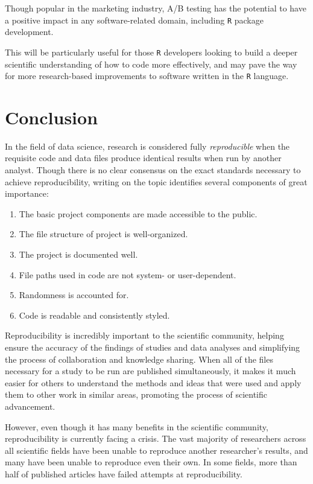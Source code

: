 \documentclass[12pt,twoside]{reedthesis}
\begin{document}
Though popular in the marketing industry, A/B testing has the potential to have a positive impact in any software-related domain, including \texttt{R} package development.

This will be particularly useful for those \texttt{R} developers looking to build a deeper scientific understanding of how to code more effectively, and may pave the way for more research-based improvements to software written in the \texttt{R} language.

\hypertarget{conclusion}{%
\chapter*{Conclusion}\label{conclusion}}

In the field of data science, research is considered fully \emph{reproducible} when the requisite code and data files produce identical results when run by another analyst. Though there is no clear consensus on the exact standards necessary to achieve reproducibility, writing on the topic identifies several components of great importance:
\begin{enumerate}
\def\labelenumi{\arabic{enumi}.}
\item
  The basic project components are made accessible to the public.
\item
  The file structure of project is well-organized.
\item
  The project is documented well.
\item
  File paths used in code are not system- or user-dependent.
\item
  Randomness is accounted for.
\item
  Code is readable and consistently styled.
\end{enumerate}
Reproducibility is incredibly important to the scientific community, helping ensure the accuracy of the findings of studies and data analyses and simplifying the process of collaboration and knowledge sharing. When all of the files necessary for a study to be run are published simultaneously, it makes it much easier for others to understand the methods and ideas that were used and apply them to other work in similar areas, promoting the process of scientific advancement.

However, even though it has many benefits in the scientific community, reproducibility is currently facing a crisis. The vast majority of researchers across all scientific fields have been unable to reproduce another researcher's results, and many have been unable to reproduce even their own. In some fields, more than half of published articles have failed attempts at reproducibility.
\end{document}

